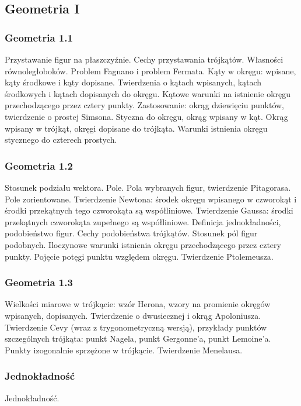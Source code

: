 \subsection{Geometria I}
\subsubsection{Geometria 1.1}
Przystawanie figur na płaszczyźnie. %
Cechy przystawania trójkątów. %
Własności równoległoboków.
Problem Fagnano i problem Fermata.
Kąty w okręgu: wpisane, kąty środkowe i kąty dopisane.
Twierdzenia o kątach wpisanych, kątach środkowych i kątach dopisanych do okręgu.
Kątowe warunki na istnienie okręgu przechodzącego przez cztery punkty.
Zastosowanie: okrąg dziewięciu punktów, twierdzenie o prostej Simsona.
Styczna do okręgu, okrąg wpisany w kąt.
Okrąg wpisany w trójkąt, okręgi dopisane do trójkąta.
Warunki istnienia okręgu stycznego do czterech prostych.

\subsubsection{Geometria 1.2}
Stosunek podziału wektora.
Pole.
Pola wybranych figur, twierdzenie Pitagorasa.
Pole zorientowane.
Twierdzenie Newtona: środek okręgu wpisanego w czworokąt i środki przekątnych tego czworokąta są współliniowe.
Twierdzenie Gaussa: środki przekątnych czworokąta zupełnego są współliniowe.
Definicja jednokładności, podobieństwo figur.
Cechy podobieństwa trójkątów.
Stosunek pól figur podobnych.
Iloczynowe warunki istnienia okręgu przechodzącego przez cztery punkty.
Pojęcie potęgi punktu
względem okręgu.
Twierdzenie Ptolemeusza.

\subsubsection{Geometria 1.3}
Wielkości miarowe w trójkącie: wzór Herona, wzory na promienie okręgów wpisanych, dopisanych.
Twierdzenie o dwusiecznej i okrąg Apoloniusza.
Twierdzenie Cevy (wraz z trygonometryczną wersją), przykłady punktów szczególnych trójkąta: punkt Nagela, punkt Gergonne'a, punkt Lemoine'a.
Punkty izogonalnie sprzężone w trójkącie.
Twierdzenie Menelausa.

\subsubsection{Jednokładność}
Jednokładność.


